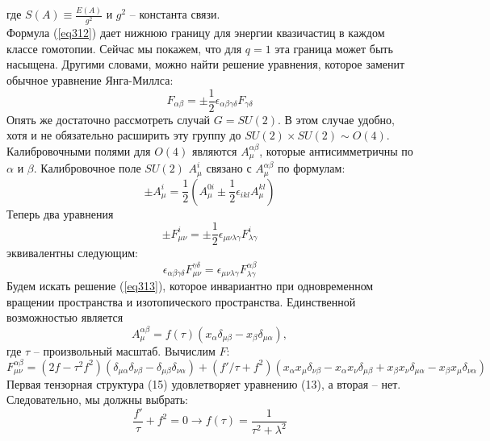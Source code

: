 \documentclass[12pt]{article}
\theoremstyle{definition}
\begin{document}
где $S(A)\equiv\frac{E(A)}{g^2}$ и $g^2$ -- константа связи.\\
Формула (\ref{eq312}) дает нижнюю границу для энергии квазичастиц в каждом классе гомотопии. Сейчас мы покажем, что для $q = 1$ эта граница может быть насыщена. Другими словами, можно найти решение уравнения, которое заменит обычное уравнение Янга-Миллса:
\begin{equation}
    F_{\alpha\beta}=\pm\frac{1}{2}\epsilon_{\alpha\beta\gamma\delta}F_{\gamma\delta}
\end{equation}
Опять же достаточно рассмотреть случай $G = SU(2)$. В этом случае удобно, хотя и не обязательно расширить эту группу до $SU(2) \times SU(2) \sim O(4)$. Калибровочными полями для $O(4)$ являются $A^{\alpha\beta}_\mu$, которые антисимметричны по $\alpha$ и $\beta$. Калибровочное поле $SU(2)$ $A_\mu^i$ связано с $A_\mu^{\alpha\beta}$ по формулам:
\begin{equation}
    \pm A^i_\mu=\frac{1}{2}(A_\mu^{0i}\pm\frac{1}{2}\epsilon_{ikl}A_\mu^{kl})
\end{equation}
Теперь два уравнения
\begin{equation}
    \pm F^i_{\mu\nu}=\pm\frac{1}{2}\epsilon_{\mu\nu\lambda\gamma}F^i_{\lambda\gamma}
\end{equation}
эквивалентны следующим:
\begin{equation}\label{eq313}
    \epsilon_{\alpha\beta\gamma\delta}F^{\gamma\delta}_{\mu\nu}=\epsilon_{\mu\nu\lambda\gamma}F^{\alpha\beta}_{\lambda\gamma}
\end{equation}
Будем искать решение (\ref{eq313}), которое инвариантно при одновременном вращении пространства и изотопического пространства. Единственной возможностью является
\begin{equation}\label{eq315}
    A_\mu^{\alpha\beta}=f(\tau)(x_\alpha\delta_{\mu\beta}-x_\beta\delta_{\mu\alpha}),
\end{equation}
где $\tau$ -- произвольный масштаб. Вычислим $F$:
\begin{equation}
    F_{\mu\nu}^{\alpha\beta}=(2f-\tau^2f^2)(\delta_{\mu\alpha}\delta_{\nu\beta}-\delta_{\mu\beta}\delta_{\nu\alpha})+(f'/\tau+f^2)(x_\alpha x_\mu\delta_{\nu\beta}-x_\alpha x_\nu\delta_{\mu\beta}+x_\beta x_\nu\delta_{\mu\alpha}-x_\beta x_\mu\delta_{\nu\alpha})
\end{equation}
Первая тензорная структура (15) удовлетворяет уравнению (13), а вторая -- нет. Следовательно, мы должны выбрать:
\begin{equation}
    \frac{f'}{\tau}+f^2=0\rightarrow f(\tau)=\frac{1}{\tau^2+\lambda^2}
\end{equation}
\end{document}

